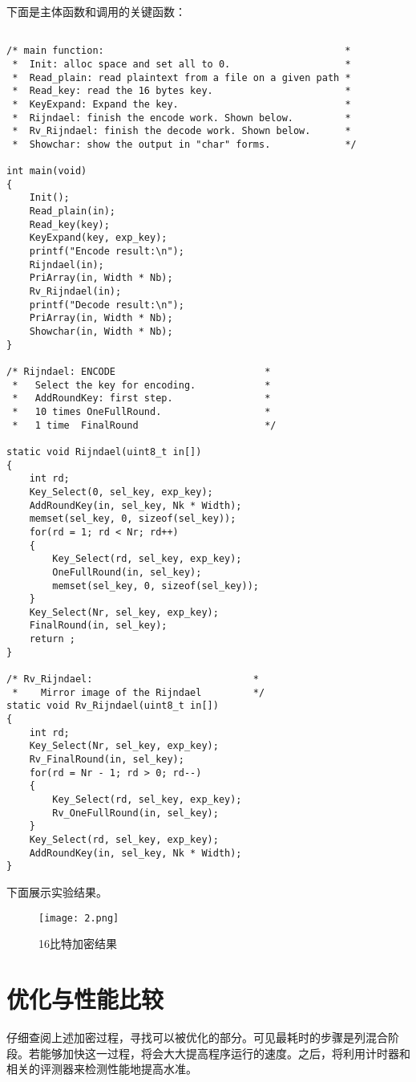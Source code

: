 \documentclass[UTF8]{ctexart}
\begin{document}
下面是主体函数和调用的关键函数：
\begin{lstlisting}

/* main function:                                          *
 * 	Init: alloc space and set all to 0.                    *
 *  Read_plain: read plaintext from a file on a given path *
 *  Read_key: read the 16 bytes key.                       *
 *  KeyExpand: Expand the key.                             *
 *  Rijndael: finish the encode work. Shown below.         *
 *  Rv_Rijndael: finish the decode work. Shown below.      *
 *  Showchar: show the output in "char" forms.             */

int main(void)
{
	Init();
	Read_plain(in);
	Read_key(key);
	KeyExpand(key, exp_key);
	printf("Encode result:\n");
	Rijndael(in);
	PriArray(in, Width * Nb);
	Rv_Rijndael(in);
	printf("Decode result:\n");
	PriArray(in, Width * Nb);
	Showchar(in, Width * Nb);
}

/* Rijndael: ENCODE                          *
 *   Select the key for encoding.            *
 *   AddRoundKey: first step.                *
 *   10 times OneFullRound.                  *
 *   1 time  FinalRound                      */

static void Rijndael(uint8_t in[])
{
	int rd;
	Key_Select(0, sel_key, exp_key);
	AddRoundKey(in, sel_key, Nk * Width);
	memset(sel_key, 0, sizeof(sel_key));
	for(rd = 1; rd < Nr; rd++)
	{
		Key_Select(rd, sel_key, exp_key);
		OneFullRound(in, sel_key);
		memset(sel_key, 0, sizeof(sel_key));
	}
	Key_Select(Nr, sel_key, exp_key);
	FinalRound(in, sel_key);
	return ;
}

/* Rv_Rijndael:                            *
 *    Mirror image of the Rijndael         */
static void Rv_Rijndael(uint8_t in[])
{
	int rd;
	Key_Select(Nr, sel_key, exp_key);
	Rv_FinalRound(in, sel_key);
	for(rd = Nr - 1; rd > 0; rd--)
	{
		Key_Select(rd, sel_key, exp_key);
		Rv_OneFullRound(in, sel_key);
	}
	Key_Select(rd, sel_key, exp_key);
	AddRoundKey(in, sel_key, Nk * Width);
}
\end{lstlisting}
下面展示实验结果。
\begin{figure}[htb]
  \centering
  \texttt{[image: 2.png]} 
  \caption{16比特加密结果} 
  \label{img} 
\end{figure}

\part{优化与性能比较}
仔细查阅上述加密过程，寻找可以被优化的部分。可见最耗时的步骤是列混合阶段。若能够加快这一过程，将会大大提高程序运行的速度。之后，将利用计时器和相关的评测器来检测性能地提高水准。
\end{document}
